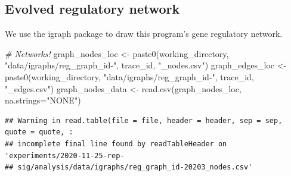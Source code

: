 \documentclass[
]{book}
\newenvironment{Shaded}{\begin{snugshade}}{\end{snugshade}}
\newcommand{\AttributeTok}[1]{\textcolor[rgb]{0.77,0.63,0.00}{#1}}
\newcommand{\CommentTok}[1]{\textcolor[rgb]{0.56,0.35,0.01}{\textit{#1}}}
\newcommand{\FunctionTok}[1]{\textcolor[rgb]{0.00,0.00,0.00}{#1}}
\newcommand{\NormalTok}[1]{#1}
\newcommand{\OtherTok}[1]{\textcolor[rgb]{0.56,0.35,0.01}{#1}}
\newcommand{\StringTok}[1]{\textcolor[rgb]{0.31,0.60,0.02}{#1}}
\begin{document}
\hypertarget{evolved-regulatory-network}{%
\subsection{Evolved regulatory network}\label{evolved-regulatory-network}}

We use the igraph package to draw this program's gene regulatory network.

\begin{Shaded}
\begin{Highlighting}[]
\CommentTok{\# Networks!}
\NormalTok{graph\_nodes\_loc }\OtherTok{\textless{}{-}} \FunctionTok{paste0}\NormalTok{(working\_directory, }\StringTok{"data/igraphs/reg\_graph\_id{-}"}\NormalTok{, trace\_id, }\StringTok{"\_nodes.csv"}\NormalTok{)}
\NormalTok{graph\_edges\_loc }\OtherTok{\textless{}{-}} \FunctionTok{paste0}\NormalTok{(working\_directory, }\StringTok{"data/igraphs/reg\_graph\_id{-}"}\NormalTok{, trace\_id, }\StringTok{"\_edges.csv"}\NormalTok{)}
\NormalTok{graph\_nodes\_data }\OtherTok{\textless{}{-}} \FunctionTok{read.csv}\NormalTok{(graph\_nodes\_loc, }\AttributeTok{na.strings=}\StringTok{"NONE"}\NormalTok{)}
\end{Highlighting}
\end{Shaded}

\begin{verbatim}
## Warning in read.table(file = file, header = header, sep = sep, quote = quote, :
## incomplete final line found by readTableHeader on 'experiments/2020-11-25-rep-
## sig/analysis/data/igraphs/reg_graph_id-20203_nodes.csv'
\end{verbatim}
\end{document}
